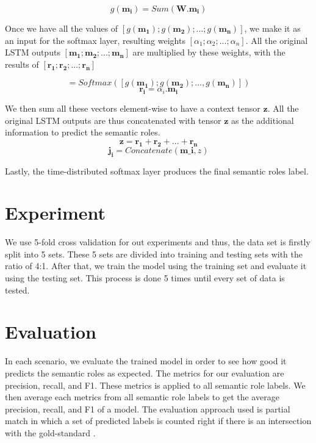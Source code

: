 \begin{equation}
\label{sum_weight}
g(\mathbf{m_{i}}) = Sum(\mathbf{W}.\mathbf{m_{i}})
\end{equation}

Once we have all the values of $[g(\mathbf{m_{1}}); g(\mathbf{m_{2}}); ...; g(\mathbf{m_{n}})]$, we make it as an input for the softmax layer, resulting weights $[\alpha_{1}; \alpha_{2}; ...; \alpha_{n}]$. All the original LSTM outputs $[\mathbf{m_{1}}; \mathbf{m_{2}}; ...; \mathbf{m_{n}}]$ are multiplied by these weights, with the results of $[\mathbf{r_{1}}; \mathbf{r_{2}}; ...; \mathbf{r_{n}}]$

\begin{equation}
[\alpha_{1}, \alpha_{2}, ..., \alpha_{n}] = Softmax([g(\mathbf{m_{1}}); g(\mathbf{m_{2}}); ..., g(\mathbf{m_{n}})])
\end{equation}
\begin{equation}
\mathbf{r_{i}} = \alpha_{i}.\mathbf{m_{i}}
\end{equation}

We then sum all these vectors element-wise to have a context tensor $\mathbf{z}$. 
All the original LSTM outputs are thus concatenated with tensor $\mathbf{z}$ as the additional information to predict the semantic roles.
\begin{equation}
\mathbf{z} = \mathbf{r_{1}} + \mathbf{r_{2}} + ... + \mathbf{r_{n}}
\end{equation}
\begin{equation}
\mathbf{j_{i}} = Concatenate(\mathbf{m\_{i}}, z)
\end{equation}

Lastly, the time-distributed softmax layer produces the final semantic roles label.

\section{Experiment}
We use 5-fold cross validation for out experiments and thus, the data set is firstly split into 5 sets. These 5 sets are divided into training and testing sets with the ratio of 4:1. After that, we train the model using the training set and evaluate it using the testing set. This process is done 5 times until every set of data is tested.

\section{Evaluation}
In each scenario, we evaluate the trained model in order to see how good it predicts the semantic roles as expected. The metrics for our evaluation are precision, recall, and F1. These metrics is applied to all semantic role labels. We then average each metrics from all semantic role labels to get the average precision, recall, and F1 of a model. The evaluation approach used is partial match in which a set of predicted labels is counted right if there is an intersection with the gold-standard \citep{seki2003probabilistic}. 

